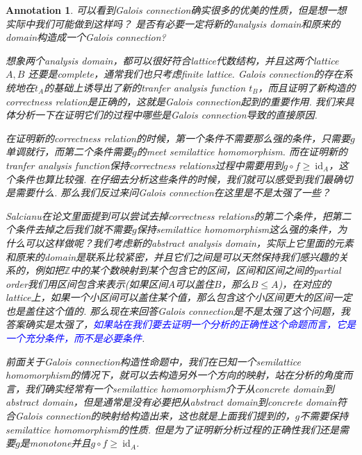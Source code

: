 \documentclass{article}
\newtheorem{annotation}[theorem]{Annotation}
\newcommand{\bluet}[1]{\textcolor{blue}{#1}}
\begin{document}
\begin{annotation}
\rm 可以看到Galois connection确实很多的优美的性质，但是想一想实际中我们可能做到这样吗？ 是否有必要一定将新的analysis domain和原来的domain构造成一个Galois connection?

想象两个analysis domain，都可以很好符合lattice代数结构，并且这两个lattice $A,B$ 还要是complete，通常我们也只考虑finite lattice. Galois connection的存在系统地在$t_A$的基础上诱导出了新的tranfer analysis function $t_B$，而且证明了新构造的correctness relation是正确的，这就是Galois connection起到的重要作用. 我们来具体分析一下在证明它们的过程中哪些是Galois connection导致的直接原因. 

在证明新的correctness relation的时候，第一个条件不需要那么强的条件，只需要$g$单调就行，而第二个条件需要$g$的meet semilattice homomorphism. 而在证明新的tranfer analysis function保持correctness relations过程中需要用到$g \circ f \geq~\text{id}_A$，这个条件也算比较强. 在仔细去分析这些条件的时候，我们就可以感受到我们最确切是需要什么. 那么我们反过来问Galois connection在这里是不是太强了一些？

Salcianu在论文\cite{salcianu}里面提到可以尝试去掉correctness relations的第二个条件，把第二个条件去掉之后我们就不需要$g$保持semilattice homomorphism这么强的条件，为什么可以这样做呢？我们考虑新的abstract analysis domain，实际上它里面的元素和原来的domain是联系比较紧密，并且它们之间是可以天然保持我们感兴趣的关系的，例如把$\mathbb{Z}$中的某个数映射到某个包含它的区间，区间和区间之间的partial order我们用区间包含来表示(如果区间$A$可以盖住$B$，那么$B \leq A$)，在对应的lattice上，如果一个小区间可以盖住某个值，那么包含这个小区间更大的区间一定也是盖住这个值的. 那么现在来回答Galois connection是不是太强了这个问题，我答案确实是太强了，\bluet{如果站在我们要去证明一个分析的正确性这个命题而言，它是一个充分条件，而不是必要条件}.

前面关于Galois connection构造性命题中，我们在已知一个semilattice homomorphism的情况下，就可以去构造另外一个方向的映射，站在分析的角度而言，我们确实经常有一个semilattice homomorphism介于从concrete domain到abstract domain，但是通常是没有必要把从abstract domain到concrete domain符合Galois connection的映射给构造出来，这也就是上面我们提到的，$g$不需要保持semilattice homomorphism的性质. 但是为了证明新分析过程的正确性我们还是需要$g$是monotone并且$g\circ f \geq ~ \text{id}_A$.
\end{annotation}
\end{document}
